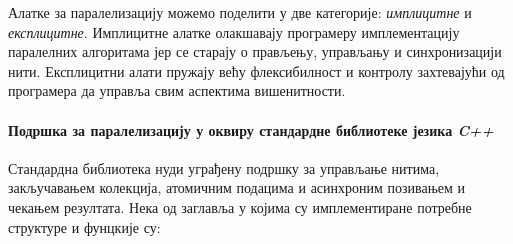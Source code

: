 \documentclass[12pt,oneside]{memoir}
\begin{document}
 Алатке за паралелизацију можемо поделити у две категорије: \textit{имплицитне} и \textit{експлицитне}. Имплицитне алатке олакшавају програмеру имплементацију паралелних алгоритама јер се старају о прављењу, управљању и синхронизацији нити. Експлицитни алати пружају већу флексибилност и контролу захтевајући од програмера да управља свим аспектима вишенитности.
\paragraph{Подршка за паралелизацију у оквиру стандардне библиотеке језика \textit{C++}}

Стандардна библиотека нуди уграђену подршку за управљање нитима, закључавањем колекција, атомичним подацима и асинхроним позивањем и чекањем резултата. Нека од заглавља у којима су имплементиране потребне структуре и фунцкије су:
\end{document}
